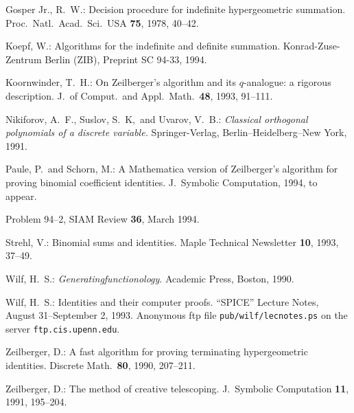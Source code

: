\begin{thebibliography}{99}

Gosper Jr., R.\ W.:
Decision procedure for indefinite hypergeometric
summation. Proc.\ Natl.\ Acad.\ Sci.\ USA {\bf 75}, 1978, 40--42.

Koepf, W.:
Algorithms for the indefinite and definite summation.
Konrad-Zuse-Zentrum Berlin (ZIB), Preprint SC 94-33, 1994.

Koornwinder, T.\ H.:
On Zeilberger's algorithm and its $q$-analogue: a rigorous description.
J.\ of Comput.\ and Appl.\ Math.\ {\bf 48}, 1993, 91--111.

Nikiforov, A.\ F., Suslov, S.\ K,\ and Uvarov, V.\ B.: {\sl Classical
orthogonal polynomials of a discrete variable.} Springer-Verlag,
Berlin--Heidelberg--New York, 1991.

Paule, P.\ and Schorn, M.: A {\sc Mathematica} version of Zeilberger's
algorithm for proving binomial coefficient identities. J.\ Symbolic
Computation, 1994, to appear.

Problem 94--2, SIAM Review {\bf 36}, March 1994.

Strehl, V.:
Binomial sums and identities. Maple Technical Newsletter {\bf 10}, 1993, 37--49.

Wilf, H.\ S.:
{\sl Generatingfunctionology}. Academic Press, Boston, 1990.

Wilf, H.\ S.:
Identities and their computer proofs. ``SPICE'' Lecture Notes,
August 31--September 2, 1993.
Anonymous ftp file {\tt pub/wilf/lecnotes.ps} on
the server {\tt ftp.cis.upenn.edu}.

Zeilberger, D.:
A fast algorithm for proving terminating hypergeometric identities.
Discrete Math.\ {\bf 80}, 1990, 207--211.

Zeilberger, D.:
The method of creative telescoping.
J.\ Symbolic Computation {\bf 11}, 1991, 195--204.

\end{thebibliography}



